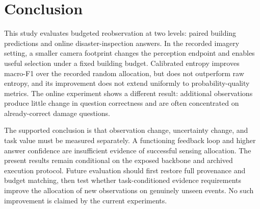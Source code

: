 \section{Conclusion}
This study evaluates budgeted reobservation at two levels: paired building predictions and online disaster-inspection answers. In the recorded imagery setting, a smaller camera footprint changes the perception endpoint and enables useful selection under a fixed building budget. Calibrated entropy improves macro-F1 over the recorded random allocation, but does not outperform raw entropy, and its improvement does not extend uniformly to probability-quality metrics. The online experiment shows a different result: additional observations produce little change in question correctness and are often concentrated on already-correct damage questions.

The supported conclusion is that observation change, uncertainty change, and task value must be measured separately. A functioning feedback loop and higher answer confidence are insufficient evidence of successful sensing allocation. The present results remain conditional on the exposed backbone and archived execution protocol. Future evaluation should first restore full provenance and budget matching, then test whether task-conditioned evidence requirements improve the allocation of new observations on genuinely unseen events. No such improvement is claimed by the current experiments.

